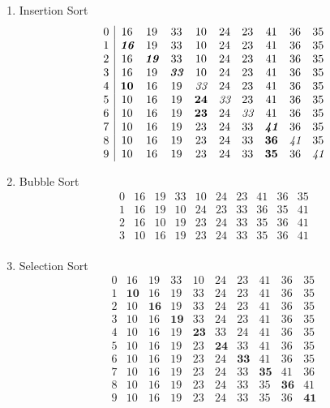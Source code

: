 \documentclass[a4paper,11pt]{article}             %
\begin{document}

\begin{enumerate}
\item Insertion Sort
\begin{equation*}
\begin{array}{l|ccccccccc}
0&16&19&33&10&24&23&41&36&35\\
1&\textit{\textbf{16}}&19&33&10&24&23&41&36&35\\
2&16&\textit{\textbf{19}}&33&10&24&23&41&36&35\\
3&16&19&\textit{\textbf{33}}&10&24&23&41&36&35\\
4&\textbf{10}&16&19&\textit{33}&24&23&41&36&35\\
5&10&16&19&\textbf{24}&\textit{33}&23&41&36&35\\
6&10&16&19&\textbf{23}&24&\textit{33}&41&36&35\\
7&10&16&19&23&24&33&\textit{\textbf{41}}&36&35\\
8&10&16&19&23&24&33&\textbf{36}&\textit{41}&35\\
9&10&16&19&23&24&33&\textbf{35}&36&\textit{41}\\
\end{array}
\end{equation*}

\item Bubble Sort
\begin{equation*}
\begin{array}{l|ccccccccc}
0&16&19&33&10&24&23&41&36&35\\
1&16&19&10&24&23&33&36&35&41\\
2&16&10&19&23&24&33&35&36&41\\
3&10&16&19&23&24&33&35&36&41\\
\end{array}
\end{equation*}

\item Selection Sort
\begin{equation*}
\begin{array}{l|ccccccccc}
0&16&19&33&10&24&23&41&36&35\\
1&\textbf{10}&16&19&33&24&23&41&36&35\\
2&10&\textbf{16}&19&33&24&23&41&36&35\\
3&10&16&\textbf{19}&33&24&23&41&36&35\\
4&10&16&19&\textbf{23}&33&24&41&36&35\\
5&10&16&19&23&\textbf{24}&33&41&36&35\\
6&10&16&19&23&24&\textbf{33}&41&36&35\\
7&10&16&19&23&24&33&\textbf{35}&41&36\\
8&10&16&19&23&24&33&35&\textbf{36}&41\\
9&10&16&19&23&24&33&35&36&\textbf{41}\\
\end{array}
\end{equation*}


\end{enumerate}
\end{document}
